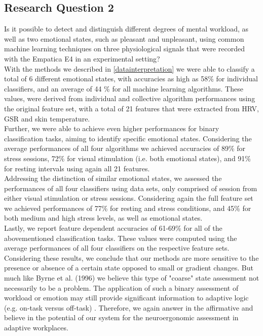 \subsection{Research Question 2}  
Is it possible to detect and distinguish different degrees of mental workload, as well as two emotional states, such as pleasant and unpleasant, using common machine learning techniques on three physiological signals that were recorded with the Empatica E4 in an experimental setting?\\[10pt]
With the methods we described in \ref{datainterpretation} we were able to classify a total of 6 different emotional states, with accuracies as high as 58\% for individual classifiers, and an average of 44 \% for all machine learning algorithms. These values, were derived from individual and collective algorithm performances using the original feature set, with a total of 21 features that were extracted from HRV, GSR and skin temperature.\\
Further, we were able to achieve even higher performances for binary classification tasks, aiming to identify specific emotional states. Considering the average performances of all four algorithms we achieved accuracies of 89\% for stress sessions, 72\% for visual stimulation (i.e. both emotional states), and 91\% for resting intervals using again all 21 features.\\
Addressing the distinction of similar emotional states, we assessed the performances of all four classifiers using data sets, only comprised of session from either visual stimulation or stress sessions. Considering again the full feature set we achieved performances of 77\% for resting and stress conditions, and 45\% for both medium and high stress levels, as well as emotional states.\\
Lastly, we report feature dependent accuracies of 61-69\% for all of the abovementioned classification tasks. These values were computed using the average performances of all four classifiers on the respective feature sets.\\
Considering these results, we conclude that our methods are more sensitive to the presence or absence of a certain state opposed to small or gradient changes. But much like Byrne et al. (1996) we believe this type of "coarse" state assessment not necessarily to be a problem. The application of such a binary assessment of workload or emotion may still provide significant information to adaptive logic (e.g. on-task versus off-task) \cite{byrne1996}. Therefore, we again answer in the affirmative and believe in the potential of our system for the neuroergonomic assessment in adaptive workplaces. 

